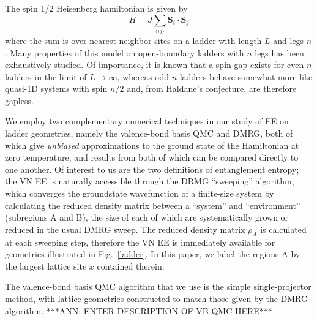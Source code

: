 \documentclass[prl,aps,twocolumn,floatfix,amsmath,amssymb,superscriptaddress,tightenlines]{revtex4}
\begin{document}
The spin 1/2 Heisenberg hamiltonian is given by
\begin{equation}
H = J \sum_{\langle i j \rangle} {\mathbf S}_i \cdot {\mathbf S}_j \label{ham}
\end{equation}
where the sum is over nearest-neighbor sites on a ladder with length $L$ and legs $n$.  Many properties of this model on open-boundary ladders with $n$ legs has been exhaustively studied.  Of importance, it is known that a spin gap exists for even-$n$ ladders in the limit of $L\rightarrow \infty$, whereas odd-$n$ ladders behave somewhat more like quasi-1D  systems with spin $n/2$ and, from Haldane's conjecture, are therefore gapless.  

We employ two complementary numerical techniques in our study of EE on ladder geometries, namely the valence-bond basis QMC and DMRG, both of which give {\it unbiased} approximations to the ground state of the Hamiltonian at zero temperature, and results from both of which can be compared directly to one another.  Of interest to us are the two definitions of entanglement entropy; the VN EE is naturally accessible through the DRMG ``sweeping'' algorithm, which converges the groundstate wavefunction of a finite-size system by calculating the reduced density matrix between a ``system'' and ``environment'' (subregions A and B), the size of each of which are systematically grown or reduced in the usual DMRG sweep.  The reduced density matrix $\rho_A$ is calculated at each sweeping step, therefore the VN EE is immediately available for geometries illustrated in Fig.~\ref{ladder}.  In this paper, we label the regions A by the largest lattice site $x$ contained therein.

The valence-bond basis QMC algorithm that we use is the simple single-projector method, with lattice geometries constructed to match those given by the DMRG algorithm.  
***ANN: ENTER DESCRIPTION OF VB QMC HERE***
\end{document}
